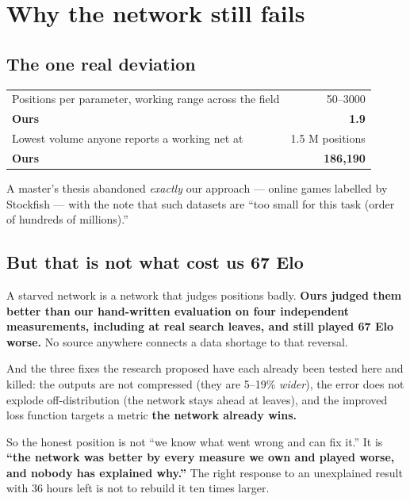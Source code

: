 \documentclass[11pt,a4paper]{article}
\newcommand{\bad}[1]{\textcolor{red!65!black}{\textbf{#1}}}
\begin{document}
\section{Why the network still fails}

\subsection{The one real deviation}

\begin{center}
\begin{tabular}{lr}
\toprule
Positions per parameter, working range across the field & 50--3000 \\
\textbf{Ours} & \bad{1.9} \\
\midrule
Lowest volume anyone reports a working net at & 1.5 M positions \\
\textbf{Ours} & \bad{186{,}190} \\
\bottomrule
\end{tabular}
\end{center}

A master's thesis abandoned \emph{exactly} our approach --- online games labelled by Stockfish ---
with the note that such datasets are ``too small for this task (order of hundreds of millions).''

\subsection{But that is not what cost us 67 Elo}

A starved network is a network that judges positions badly. \textbf{Ours judged them better than
our hand-written evaluation on four independent measurements, including at real search leaves,
and still played 67 Elo worse.} No source anywhere connects a data shortage to that reversal.

And the three fixes the research proposed have each already been tested here and killed: the
outputs are not compressed (they are 5--19\% \emph{wider}), the error does not explode
off-distribution (the network stays ahead at leaves), and the improved loss function targets a
metric \textbf{the network already wins.}

\begin{keybox}
So the honest position is not ``we know what went wrong and can fix it.'' It is
\textbf{``the network was better by every measure we own and played worse, and nobody has
explained why.''} The right response to an unexplained result with 36 hours left is not to
rebuild it ten times larger.
\end{keybox}
\end{document}
